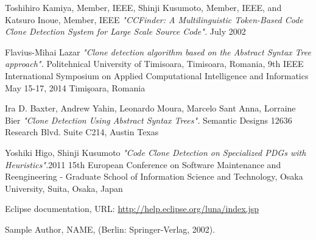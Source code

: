 \documentclass{report}
\begin{document}
\begin{thebibliography}{100}
 Toshihiro Kamiya, Member, IEEE, Shinji Kusumoto, Member, IEEE, and Katsuro Inoue, Member, IEEE \emph{"CCFinder: A Multilinguistic Token-Based Code Clone Detection System for Large Scale Source Code".} July 2002

 Flavius-Mihai Lazar \emph{"Clone detection algorithm based on the Abstract Syntax Tree approach".} Politehnical University of Timisoara, Timisoara, Romania, 9th IEEE International Symposium on Applied Computational Intelligence and Informatics May 15-17, 2014 Timişoara, Romania

 Ira D. Baxter, Andrew Yahin, Leonardo Moura, Marcelo Sant Anna, Lorraine Bier \emph{"Clone Detection Using Abstract Syntax Trees".} Semantic Designs 12636 Research Blvd. Suite C214, Austin Texas

 Yoshiki Higo, Shinji Kusumoto \emph{"Code Clone Detection on Specialized PDGs with Heuristics".}2011 15th European Conference on Software Maintenance and Reengineering - Graduate School of Information Science and Technology, Osaka University, Suita, Osaka, Japan

 Eclipse documentation, URL: \url{http://help.eclipse.org/luna/index.jsp}



 Sample Author, NAME,
(Berlin: Springer-Verlag, 2002).

\end{thebibliography} 
\end{document}
